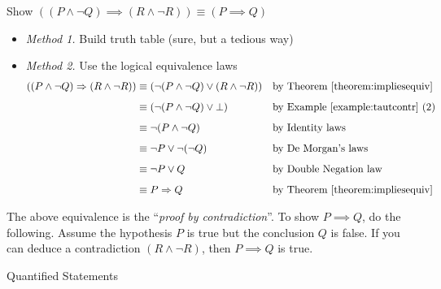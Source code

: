 \vspace*{1em}

\begin{example}
Show $((P \wedge \neg Q) \implies (R \wedge \neg R)) \equiv (P \implies Q)$
\begin{itemize}
\item[] \emph{Method 1.} Build truth table (sure, but a tedious way)
\item[] \emph{Method 2.} Use the logical equivalence laws
\begin{align*}
((P \wedge \neg Q) \implies (R \wedge \neg R)) &\equiv (\neg(P \wedge \neg Q) \vee (R \wedge \neg R)) && \text{by Theorem \ref{theorem:impliesequiv}}\\[0.5em]
 &\equiv (\neg(P \wedge \neg Q) \vee \bot) && \text{by Example \ref{example:tautcontr} (2)}\\[0.5em]
 &\equiv \neg(P \wedge \neg Q) && \text{by Identity laws}\\[0.5em]
 &\equiv \neg P \vee \neg(\neg Q) && \text{by De Morgan's laws}\\[0.5em]
 &\equiv \neg P \vee Q && \text{by Double Negation law}\\[0.5em]
 &\equiv P \implies Q && \text{by Theorem \ref{theorem:impliesequiv}}
\end{align*}
\end{itemize}
The above equivalence is the ``\emph{proof by contradiction}''. To show $P \implies Q$, do the following. Assume the hypothesis $P$ is true but the conclusion $Q$ is false. If you can deduce a contradiction $(R \wedge \neg R)$, then $P \implies Q$ is true.
\end{example}

\vspace*{2em}

\begin{mdframed}
\begin{center}
{\Large Quantified Statements}
\end{center}
\end{mdframed}

